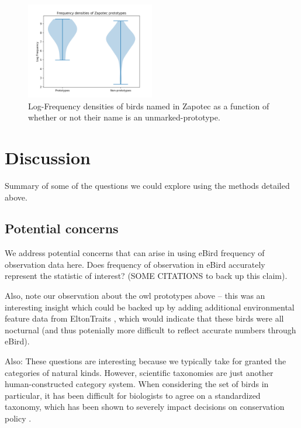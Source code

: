 \documentclass[10pt,letterpaper]{article}
\begin{document}
\begin{figure}[h!]
  \begin{center}
    \includegraphics[width=0.5\textwidth]{./figures/prototypefreqs-violinplots.png}
        \caption{Log-Frequency densities of birds named in Zapotec as a function of whether or not their name is an unmarked-prototype.}
        \label{fig-freq-prototype-densities}
  \end{center}
\end{figure}







\section{Discussion}

Summary of some of the questions we could explore using the methods detailed above.

\subsection{Potential concerns}

We address potential concerns that can arise in using eBird frequency of observation data here. Does frequency of observation in eBird accurately represent the statistic of interest? (SOME CITATIONS to back up this claim). 

Also, note our observation about the owl prototypes above -- this was an interesting insight which could be backed up by adding additional environmental feature data from EltonTraits \cite{wilman2014eltontraits}, which would indicate that these birds were all nocturnal (and thus potenially more difficult to reflect accurate numbers through eBird).

Also: These questions are interesting because we typically take for granted the categories of natural kinds. However, scientific taxonomies are just another human-constructed category system. When considering the set of birds in particular, it has been difficult for biologists to agree on a standardized taxonomy, which has been shown to severely impact decisions on conservation policy \cite{peterson2006taxonomy,garnett2017taxonomy}.
\end{document}
